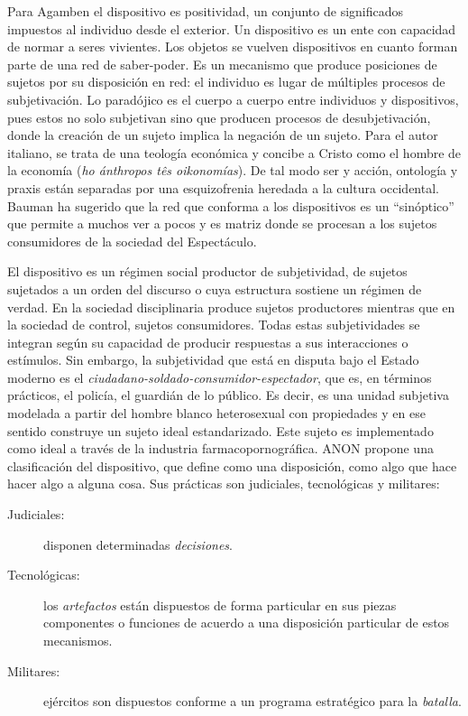 Para Agamben el dispositivo es positividad, un conjunto de significados impuestos al individuo desde el exterior. Un dispositivo es un ente con capacidad de normar a seres vivientes. Los objetos se vuelven dispositivos en cuanto forman parte de una red de saber-poder. Es un mecanismo que produce posiciones de sujetos por su disposición en red: el individuo es lugar de múltiples procesos de subjetivación. Lo paradójico es el cuerpo a cuerpo entre individuos y dispositivos, pues estos no solo subjetivan sino que producen procesos de desubjetivación, donde la creación de un sujeto implica la negación de un sujeto. Para el autor italiano, se trata de una teología económica y concibe a Cristo como el hombre de la economía (\emph{ho ánthropos tês oikonomías}).  De tal modo ser y acción, ontología y praxis están separadas por una esquizofrenia heredada a la cultura occidental. Bauman ha sugerido que la red que conforma a los dispositivos es un \enquote{sinóptico} que permite a muchos ver a pocos y es matriz donde se procesan a los sujetos consumidores de la sociedad del Espectáculo.

El dispositivo es un régimen social productor de subjetividad, de sujetos sujetados a un orden del discurso o cuya estructura sostiene un régimen de verdad. En la sociedad disciplinaria produce sujetos productores mientras que en la sociedad de control, sujetos consumidores. Todas estas subjetividades se integran según su capacidad de producir respuestas a sus interacciones o estímulos. Sin embargo, la subjetividad que está en disputa bajo el Estado moderno es el \emph{ciudadano-soldado-consumidor-espectador}, que es, en términos prácticos, el policía, el guardián de lo público. Es decir, es una unidad subjetiva modelada a partir del hombre blanco heterosexual con propiedades y en ese sentido construye un sujeto ideal estandarizado. Este sujeto es implementado como ideal a través de la industria farmacopornográfica. ANON propone una clasificación del dispositivo, que define como una disposición, como algo que hace hacer algo a alguna cosa. Sus prácticas son judiciales, tecnológicas y militares:

\begin{description}
  \item[Judiciales:] disponen determinadas \emph{decisiones}.
  \item[Tecnológicas:] los \emph{artefactos} están dispuestos de forma particular en sus piezas componentes o funciones de acuerdo a una disposición particular de estos mecanismos.
  \item[Militares:] ejércitos son dispuestos conforme a un programa estratégico para la \emph{batalla}.
\end{description}

